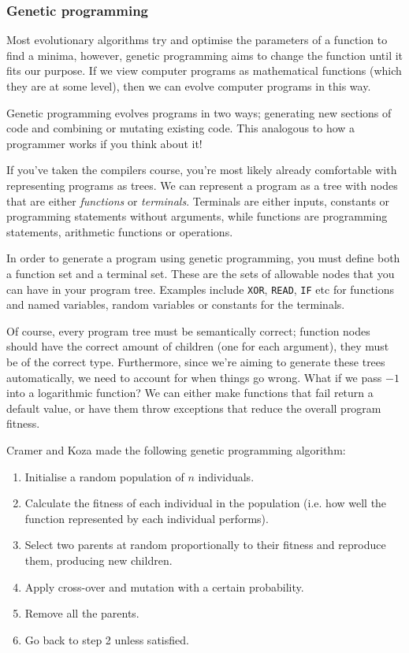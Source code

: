 
\subsubsection{Genetic programming}

Most evolutionary algorithms try and optimise the parameters of a
function to find a minima, however, genetic programming aims to change
the function until it fits our purpose. If we view computer programs
as mathematical functions (which they are at some level), then we can
evolve computer programs in this way.

Genetic programming evolves programs in two ways; generating new
sections of code and combining or mutating existing code. This
analogous to how a programmer works if you think about it!

If you've taken the compilers course, you're most likely already
comfortable with representing programs as trees. We can represent a
program as a tree with nodes that are either \textit{functions} or
\textit{terminals}. Terminals are either inputs, constants or
programming statements without arguments, while functions are
programming statements, arithmetic functions or operations.

In order to generate a program using genetic programming, you must
define both a function set and a terminal set. These are the sets of
allowable nodes that you can have in your program tree. Examples
include \texttt{XOR}, \texttt{READ}, \texttt{IF} etc for functions and
named variables, random variables or constants for the terminals.


Of course, every program tree must be semantically correct; function
nodes should have the correct amount of children (one for each
argument), they must be of the correct type. Furthermore, since we're
aiming to generate these trees automatically, we need to account for
when things go wrong. What if we pass $-1$ into a logarithmic
function? We can either make functions that fail return a default
value, or have them throw exceptions that reduce the overall program
fitness.

Cramer and Koza made the following genetic programming algorithm:

\begin{enumerate}
  \item Initialise a random population of $n$ individuals.
  \item Calculate the fitness of each individual in the population
    (i.e. how well the function represented by each individual
    performs).
  \item Select two parents at random proportionally to their fitness
    and reproduce them, producing new children.
  \item Apply cross-over and mutation with a certain probability.
  \item Remove all the parents.
  \item Go back to step 2 unless satisfied.
\end{enumerate}

